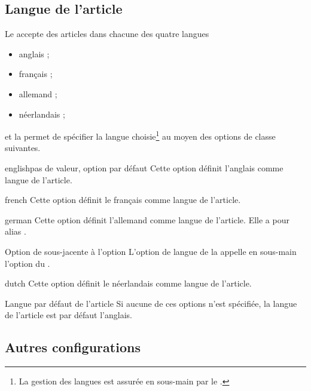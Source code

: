 \documentclass[french,nolocaltoc]{nwejmart}
\newtheorem[title=Fait,style=definition]{fact}
\begin{document}
\subsection{Langue de l'article}
\label{sec:langue-de-larticle}

Le \nwejm{} accepte des articles dans chacune des quatre langues
\begin{itemize}
\item anglais ;
\item français ;
\item allemand ;
\item néerlandais ;
\end{itemize}
et la \nwejmauthorcl{} permet de spécifier la langue choisie\footnote{La gestion
  des langues est assurée en sous-main par le .} au moyen des
options de classe suivantes.

\begin{docKey}{english}{}{pas de valeur, option par défaut}
  Cette option définit l'anglais comme langue de l'article.
\end{docKey}
\begin{docKey}{french}{}{}
  Cette option définit le français comme langue de l'article.
\end{docKey}
\begin{docKey}{german}{}{}
  Cette option définit l'allemand comme langue de l'article. Elle a pour alias
  .
  \begin{dbremark}{Option de  sous-jacente à l'option
      \protect{}}{}
    L'option de langue  de la \nwejmauthorcl{} appelle en
    sous-main l'option  du .
  \end{dbremark}
  \begin{docKey}{dutch}{}{}
  Cette option définit le néerlandais comme langue de l'article.
\end{docKey}
\end{docKey}

\begin{dbremark}{Langue par défaut de l'article}{}
  Si aucune de ces options n'est spécifiée, la langue de l'article est par
  défaut l'anglais.
\end{dbremark}

\subsection{Autres configurations}
\label{sec:autr-conf}
\end{document}
